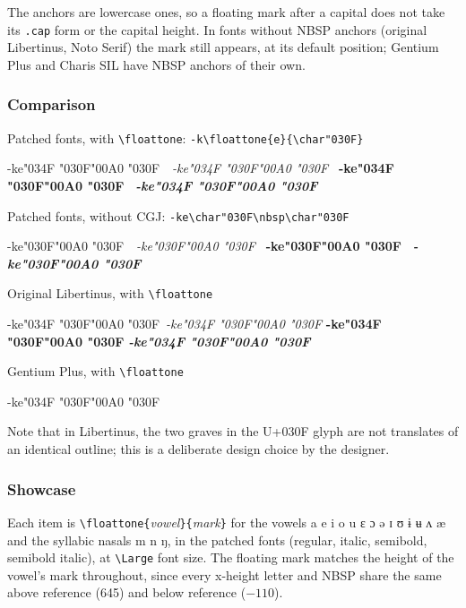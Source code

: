 \documentclass[landscape]{article}
\newcommand{\ribbiline}[1]{#1\ 
	{\itshape #1}
	{\bfseries #1}
	{\itshape\bfseries #1}}
\newcommand{\cgj}{\char"034F }
\newcommand{\nbsp}{\char"00A0 }
\newcommand{\floattone}[2]{#1\cgj#2\nbsp#2}
\begin{document}
The anchors are lowercase ones, so a floating mark after a capital does not take its \verb|.cap| form or the capital height.
In fonts without NBSP anchors (original Libertinus, Noto Serif) the mark still appears, at its default position; Gentium Plus and Charis SIL have NBSP anchors of their own.

\subsubsection*{Comparison}
Patched fonts, with \verb|\floattone|: \verb|-k\floattone{e}{\char"030F}|

{\LibertinusSerifPatch \ribbiline{-k\floattone{e}{\char"030F}\ }}

Patched fonts, without CGJ: \verb|-ke\char"030F\nbsp\char"030F|

{\LibertinusSerifPatch \ribbiline{-ke\char"030F\nbsp\char"030F\ }}

Original Libertinus, with \verb|\floattone|

\ribbiline{-k\floattone{e}{\char"030F}}

Gentium Plus, with \verb|\floattone| 

{\Gentium -k\floattone{e}{\char"030F}}

Note that in Libertinus, the two graves in the U+030F glyph are not translates of an identical outline;
this is a deliberate design choice by the designer.

\clearpage

\subsubsection*{Showcase}
Each item is \verb|\floattone{|\emph{vowel}\verb|}{|\emph{mark}\verb|}| for the vowels a e i o u ɛ ɔ ə ɪ ʊ ɨ ʉ ʌ æ and the syllabic nasals m n ŋ, in the patched fonts (regular, italic, semibold, semibold italic), 
at \verb|\Large| font size.
The floating mark matches the height of the vowel's mark throughout, since every x-height letter and NBSP share the same above reference (645) and below reference ($-110$).

\newcommand{\FLv}[2]{\floattone{#1}{\char"#2}\quad}
\newcommand{\FLvowels}[1]{\FLv{a}{#1}\FLv{e}{#1}\FLv{i}{#1}\FLv{o}{#1}\FLv{u}{#1}\FLv{ɛ}{#1}\FLv{ɔ}{#1}\FLv{ə}{#1}\FLv{ɪ}{#1}\FLv{ʊ}{#1}\FLv{ɨ}{#1}\FLv{ʉ}{#1}\FLv{ʌ}{#1}\FLv{æ}{#1}\quad\FLv{m}{#1}\FLv{n}{#1}\FLv{ŋ}{#1}}
\newcommand{\FLblock}[2]{\par\smallskip{\normalsize U+#1 #2}\par
	{\LibertinusSerifPatch\Large
	\FLvowels{#1}\par
	{\itshape \FLvowels{#1}}\par
	{\bfseries \FLvowels{#1}}\par
	{\bfseries\itshape \FLvowels{#1}}\par}}
\end{document}
